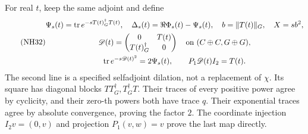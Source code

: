 \documentclass[11pt]{article}
\newcommand{\tr}{\operatorname{tr}}\newcommand{\dd}{\dagger_G}
\begin{document}
For real \(t\), keep the same adjoint and define
\begin{equation}\tag{NH32}\label{NH32}
\begin{gathered}
\Psi_s(t)=\tr e^{-sT(t)^\dd T(t)},\quad
\Delta_s(t)=\Re\Phi_s(t)-\Psi_s(t),\quad
b=\|T(t)\|_G,\quad X=sb^2,\\
\mathscr D(t)=\begin{pmatrix}0&T(t)\\T(t)^\dd&0\end{pmatrix}
\quad\hbox{on }(C\oplus C,G\oplus G),\\
\tr e^{-s\mathscr D(t)^2}=2\Psi_s(t),\qquad
P_1\mathscr D(t)I_2=T(t).
\end{gathered}
\end{equation}
The second line is a specified selfadjoint dilation, not
a replacement of \(\chi\). Its square has diagonal
blocks \(TT^\dd,T^\dd T\). Their traces of every positive
power agree by cyclicity, and their zero-th powers both
have trace \(q\). Their exponential traces agree by
absolute convergence, proving the factor \(2\).
The coordinate injection \(I_2v=(0,v)\) and projection
\(P_1(v,w)=v\) prove the last map directly.
\end{document}
